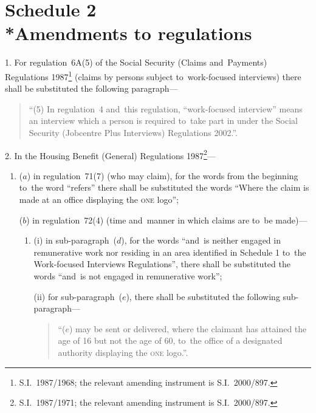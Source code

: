 \documentclass[12pt,a4paper]{article}
\begin{document}
\part[Schedule 2 --- Amendments to regulations]{Schedule 2\\*Amendments to regulations}

\renewcommand\parthead{--- Schedule 2}

1.  For regulation~6A(5) of the Social Security (Claims and~Payments) Regulations 1987\footnote{S.I.~1987/1968; the relevant amending instrument is S.I.~2000/897.} (claims by persons subject to~work-focused interviews) there shall be substituted the following paragraph—
\begin{quotation}
“(5) In regulation~4 and~this regulation, “work-focused interview” means an interview which a person is required to~take part in under the Social Security (Jobcentre Plus Interviews) Regulations 2002.”.
\end{quotation}

\medskip

\enlargethispage{-\baselineskip}

2.  In the Housing Benefit (General) Regulations 1987\footnote{S.I.~1987/1971; the relevant amending instrument is S.I.~2000/897.}—
\begin{enumerate}\item[]
($a$) in regulation~71(7) (who may claim), for the words from the beginning to~the word “refers” there shall be substituted the words “Where the claim is made at an office displaying the \textsc{\lowercase{ONE}} logo”;

($b$) in regulation~72(4) (time and~manner in which claims are to~be made)—
\begin{enumerate}\item[]
(i) in sub-paragraph~($d$), for the words “and~is neither engaged in remunerative work nor residing in an area identified in Schedule 1 to~the Work-focused Interviews Regulations”, there shall be substituted the words “and~is not engaged in remunerative work”;

(ii) for sub-paragraph~($e$), there shall be substituted the following sub-paragraph—
\begin{quotation}
“($e$) may be sent or delivered, where the claimant has attained the age of 16 but not the age of 60, to~the office of a designated authority displaying the \textsc{\lowercase{ONE}} logo.”.
\end{quotation}
\end{enumerate}
\end{enumerate}
\end{document}
